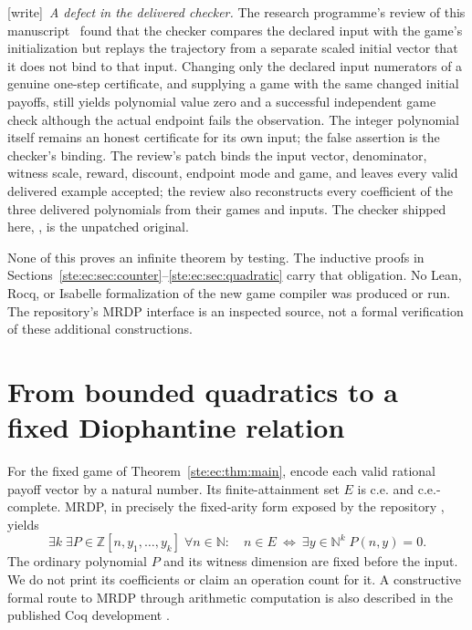\documentclass[11pt,letterpaper]{article}
\theoremstyle{definition}
\theoremstyle{remark}
\newcommand{\N}{\mathbb N}
\newcommand{\Z}{\mathbb Z}
\newcommand{\wtag}{\textup{[write]}}
\begin{document}
\wtag\ \emph{A defect in the delivered checker.} The research programme's review of this manuscript~\cite{review808} found that the checker compares the declared input with the game's initialization but replays the trajectory from a separate scaled initial vector that it does not bind to that input. Changing only the declared input numerators of a genuine one-step certificate, and supplying a game with the same changed initial payoffs, still yields polynomial value zero and a successful independent game check although the actual endpoint fails the observation. The integer polynomial itself remains an honest certificate for its own input; the false assertion is the checker's binding. The review's patch  binds the input vector, denominator, witness scale, reward, discount, endpoint mode and game, and leaves every valid delivered example accepted; the review also reconstructs every coefficient of the three delivered polynomials from their games and inputs. The checker shipped here, , is the unpatched original.

None of this proves an infinite theorem by testing. The inductive proofs
in Sections~\ref{ste:ec:sec:counter}--\ref{ste:ec:sec:quadratic} carry that obligation.
No Lean, Rocq, or Isabelle formalization of the new game compiler was
produced or run. The repository's MRDP interface is an inspected source,
not a formal verification of these additional constructions.

\section{From bounded quadratics to a fixed Diophantine relation}
\label{ste:ec:sec:mrdp}

For the fixed game of Theorem~\ref{ste:ec:thm:main}, encode each valid rational
payoff vector by a natural number. Its finite-attainment set $E$ is c.e.
and c.e.-complete. MRDP, in precisely the fixed-arity form exposed by the
repository \cite{repo-mrdp}, yields
\begin{equation}
 \exists k\;\exists P\in\Z[n,y_1,\ldots,y_k]\;
 \forall n\in\N:\quad n\in E\ \Longleftrightarrow\
 \exists y\in\N^k\;P(n,y)=0.
 \label{ste:ec:eq:mrdp}
\end{equation}
The ordinary polynomial $P$ and its witness dimension are fixed before the
input. We do not print its coefficients or claim an operation count for
it. A constructive formal route to MRDP through arithmetic computation is
also described in the published Coq development \cite{h10coq}.
\end{document}
